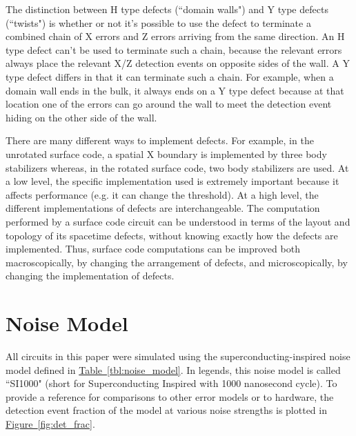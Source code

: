 \documentclass[onecolumn,unpublished,a4paper]{quantumarticle}
\theoremstyle{definition}
\theoremstyle{definition}
\theoremstyle{definition}
\newcommand{\fig}[1]{\hyperref[fig:#1]{Figure~\ref*{fig:#1}}}
\newcommand{\tbl}[1]{\hyperref[tbl:#1]{Table~\ref*{tbl:#1}}}
\begin{document}
The distinction between H type defects (``domain walls") and Y type defects (``twists") is whether or not it's possible to use the defect to terminate a combined chain of X errors and Z errors arriving from the same direction.
An H type defect can't be used to terminate such a chain, because the relevant errors always place the relevant X/Z detection events on opposite sides of the wall.
A Y type defect differs in that it can terminate such a chain.
For example, when a domain wall ends in the bulk, it always ends on a Y type defect because at that location one of the errors can go around the wall to meet the detection event hiding on the other side of the wall.

There are many different ways to implement defects.
For example, in the unrotated surface code, a spatial X boundary is implemented by three body stabilizers whereas, in the rotated surface code, two body stabilizers are used.
At a low level, the specific implementation used is extremely important because it affects performance (e.g. it can change the threshold).
At a high level, the different implementations of defects are interchangeable.
The computation performed by a surface code circuit can be understood in terms of the layout and topology of its spacetime defects, without knowing exactly how the defects are implemented.
Thus, surface code computations can be improved both macroscopically, by changing the arrangement of defects, and microscopically, by changing the implementation of defects.

\section{Noise Model}
\label{app:noise_model}

All circuits in this paper were simulated using the superconducting-inspired noise model defined in \tbl{noise_model}.
In legends, this noise model is called ``SI1000" (short for Superconducting Inspired with 1000 nanosecond cycle).
To provide a reference for comparisons to other error models or to hardware, the detection event fraction of the model at various noise strengths is plotted in \fig{det_frac}.
\end{document}
